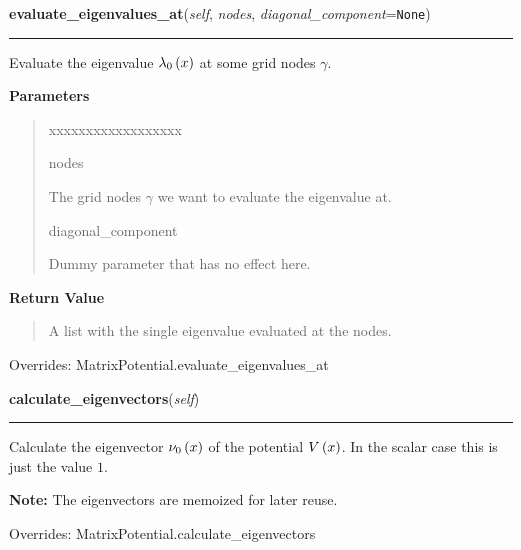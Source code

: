 \hspace{.8\funcindent}\begin{boxedminipage}{\funcwidth}

    \raggedright \textbf{evaluate\_eigenvalues\_at}(\textit{self}, \textit{nodes}, \textit{diagonal\_component}={\tt None})

    \vspace{-1.5ex}

    \rule{\textwidth}{0.5\fboxrule}
\setlength{\parskip}{2ex}
    Evaluate the eigenvalue
    $\lambda_0\left( x \right)$ at some grid
    nodes $\gamma$.

\setlength{\parskip}{1ex}
      \textbf{Parameters}
      \vspace{-1ex}

      \begin{quote}
        \begin{Ventry}{xxxxxxxxxxxxxxxxxx}

          \item[nodes]

          The grid nodes $\gamma$ we want to evaluate the
          eigenvalue at.

          \item[diagonal\_component]

          Dummy parameter that has no effect here.

        \end{Ventry}

      \end{quote}

      \textbf{Return Value}
    \vspace{-1ex}

      \begin{quote}
      A list with the single eigenvalue evaluated at the nodes.

      \end{quote}

      Overrides: MatrixPotential.evaluate\_eigenvalues\_at

    \end{boxedminipage}

    \vspace{0.5ex}

\hspace{.8\funcindent}\begin{boxedminipage}{\funcwidth}

    \raggedright \textbf{calculate\_eigenvectors}(\textit{self})

    \vspace{-1.5ex}

    \rule{\textwidth}{0.5\fboxrule}
\setlength{\parskip}{2ex}
    Calculate the eigenvector $\nu_0\left( x \right)$ of the
    potential $V\left( x \right)$. In the scalar case this is
    just the value $1$.

\setlength{\parskip}{1ex}

\textbf{Note:} The eigenvectors are memoized for later reuse.


      Overrides: MatrixPotential.calculate\_eigenvectors

    \end{boxedminipage}

